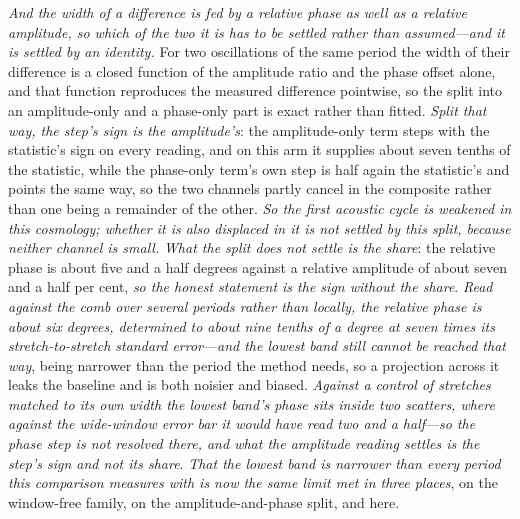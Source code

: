 \documentclass[11pt,a4paper]{article}
\theoremstyle{plain}
\theoremstyle{definition}
\theoremstyle{remark}
\begin{document}
\emph{And the width of a difference is fed by a relative phase as well as a relative amplitude, so which of
the two it is has to be settled rather than assumed---and it is settled by an identity.} For two oscillations
of the same period the width of their difference is a closed function of the amplitude ratio and the phase
offset alone, and that function reproduces the measured difference pointwise, so the split into an
amplitude-only and a phase-only part is exact rather than fitted. \emph{Split that way, the step's sign is the
amplitude's}: the amplitude-only term steps with the statistic's sign on every reading, and on this arm it
supplies about seven tenths of the statistic, while the phase-only term's own step is half again the
statistic's and points the same way, so the two channels partly cancel in the composite rather than one being
a remainder of the other. \emph{So the first acoustic cycle is weakened in this cosmology; whether it is also
displaced in it is not settled by this split, because neither channel is small.} \emph{What the split does
not settle is the share}: the relative phase is about five and a half degrees against a relative amplitude of
about seven and a half per cent, \emph{so the honest statement is the sign without the share}. \emph{Read
against the comb over several periods rather than locally, the relative phase is about six degrees, determined
to about nine tenths of a degree at seven times its stretch-to-stretch standard error}---\emph{and the lowest
band still cannot be reached that way}, being narrower than the period the method needs, so a projection
across it leaks the baseline and is both noisier and biased. \emph{Against a control of stretches matched to
its own width the lowest band's phase sits inside two scatters, where against the wide-window error bar it
would have read two and a half}---\emph{so the phase step is not resolved there, and what the amplitude
reading settles is the step's sign and not its share}. \emph{That the lowest band is narrower than every period
this comparison measures with is now the same limit met in three places}, on the window-free family, on the
amplitude-and-phase split, and
here.
\end{document}
